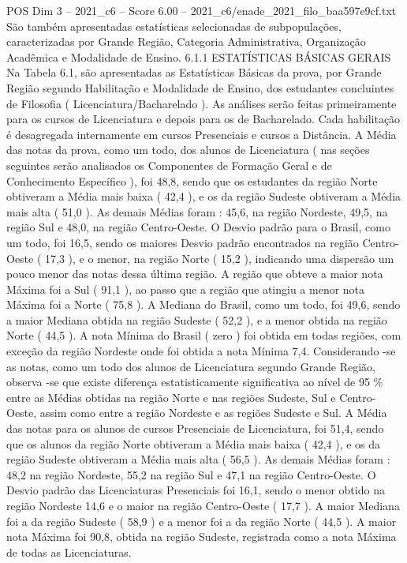 \begin{textsample}{POS Dim 3 – 2021\_c6 – Score 6.00 – 2021\_c6/enade\_2021\_filo\_baa597e9cf.txt}
São também apresentadas estatísticas selecionadas de subpopulações, caracterizadas por Grande Região, Categoria Administrativa, Organização Acadêmica e Modalidade de Ensino. 6.1.1 ESTATÍSTICAS BÁSICAS GERAIS Na Tabela 6.1, são apresentadas as Estatísticas Básicas da prova, por Grande Região segundo Habilitação e Modalidade de Ensino, dos estudantes concluintes de Filosofia ( Licenciatura/Bacharelado ).
As análises serão feitas primeiramente para os cursos de Licenciatura e depois para os de Bacharelado.
Cada habilitação é desagregada internamente em cursos Presenciais e cursos a Distância.
A Média das notas da prova, como um todo, dos alunos de Licenciatura ( nas seções seguintes serão analisados os Componentes de Formação Geral e de Conhecimento Específico ), foi 48,8, sendo que os estudantes da região Norte obtiveram a Média mais baixa ( 42,4 ), e os da região Sudeste obtiveram a Média mais alta ( 51,0 ).
As demais Médias foram : 45,6, na região Nordeste, 49,5, na região Sul e 48,0, na região Centro-Oeste.
O Desvio padrão para o Brasil, como um todo, foi 16,5, sendo os maiores Desvio padrão encontrados na região Centro-Oeste ( 17,3 ), e o menor, na região Norte ( 15,2 ), indicando uma dispersão um pouco menor das notas dessa última região.
A região que obteve a maior nota Máxima foi a Sul ( 91,1 ), ao passo que a região que atingiu a menor nota Máxima foi a Norte ( 75,8 ).
A Mediana do Brasil, como um todo, foi 49,6, sendo a maior Mediana obtida na região Sudeste ( 52,2 ), e a menor obtida na região Norte ( 44,5 ).
A nota Mínima do Brasil ( zero ) foi obtida em todas regiões, com exceção da região Nordeste onde foi obtida a nota Mínima 7,4.
Considerando -se as notas, como um todo dos alunos de Licenciatura segundo Grande Região, observa -se que existe diferença estatisticamente significativa ao nível de 95 \% entre as Médias obtidas na região Norte e nas regiões Sudeste, Sul e Centro-Oeste, assim como entre a região Nordeste e as regiões Sudeste e Sul.
A Média das notas para os alunos de cursos Presenciais de Licenciatura, foi 51,4, sendo que os alunos da região Norte obtiveram a Média mais baixa ( 42,4 ), e os da região Sudeste obtiveram a Média mais alta ( 56,5 ).
As demais Médias foram : 48,2 na região Nordeste, 55,2 na região Sul e 47,1 na região Centro-Oeste.
O Desvio padrão das Licenciaturas Presenciais foi 16,1, sendo o menor obtido na região Nordeste 14,6 e o maior na região Centro-Oeste ( 17,7 ).
A maior Mediana foi a da região Sudeste ( 58,9 ) e a menor foi a da região Norte ( 44,5 ).
A maior nota Máxima foi 90,8, obtida na região Sudeste, registrada como a nota Máxima de todas as Licenciaturas.

\end{textsample}
